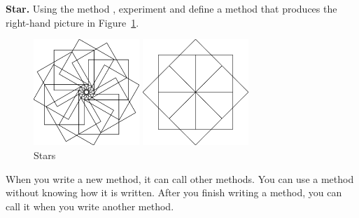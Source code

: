 

\begin{exonofig}{\textbf{Star.}} 
Using the method , experiment and define a method  that produces the right-hand picture in Figure~\ref{c7star}.
\end{exonofig}

\begin{figure}[h]
\begin{minipage}[c]{.4\linewidth}
\centerline{\includegraphics[width=4cm]{comp4SquaresThree}}
\end{minipage}
\hfill
\begin{minipage}[c]{.4\linewidth}
\centerline{\includegraphics[width=4cm]{comp4SquaresFour}}
\end{minipage}
\label{c7star}
\caption{Stars}
\end{figure}


\summa

When you write a new method, it can call other methods.
You can use a method without knowing how it is written.
After you finish writing a method, you can call it when you write another method.

\ifx\wholebook\relax\else
\fi
